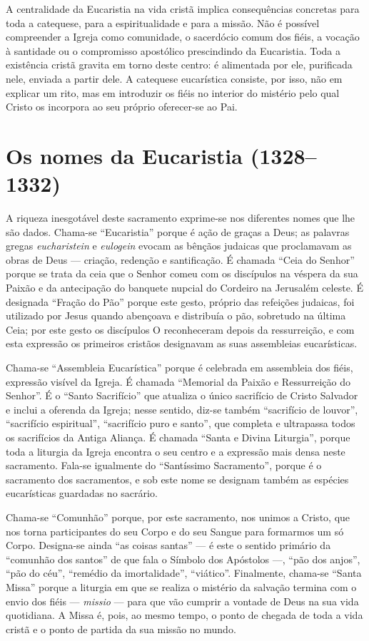 A centralidade da Eucaristia na vida cristã implica consequências concretas para toda a catequese, para a espiritualidade e para a missão. Não é possível compreender a Igreja como comunidade, o sacerdócio comum dos fiéis, a vocação à santidade ou o compromisso apostólico prescindindo da Eucaristia. Toda a existência cristã gravita em torno deste centro: é alimentada por ele, purificada nele, enviada a partir dele. A catequese eucarística consiste, por isso, não em explicar um rito, mas em introduzir os fiéis no interior do mistério pelo qual Cristo os incorpora ao seu próprio oferecer-se ao Pai.

\section{Os nomes da Eucaristia (1328--1332)}

A riqueza inesgotável deste sacramento exprime-se nos diferentes nomes que lhe são dados. Chama-se ``Eucaristia'' porque é ação de graças a Deus; as palavras gregas \emph{eucharistein} e \emph{eulogein} evocam as bênçãos judaicas que proclamavam as obras de Deus --- criação, redenção e santificação. É chamada ``Ceia do Senhor'' porque se trata da ceia que o Senhor comeu com os discípulos na véspera da sua Paixão e da antecipação do banquete nupcial do Cordeiro na Jerusalém celeste. É designada ``Fração do Pão'' porque este gesto, próprio das refeições judaicas, foi utilizado por Jesus quando abençoava e distribuía o pão, sobretudo na última Ceia; por este gesto os discípulos O reconheceram depois da ressurreição, e com esta expressão os primeiros cristãos designavam as suas assembleias eucarísticas.

Chama-se ``Assembleia Eucarística'' porque é celebrada em assembleia dos fiéis, expressão visível da Igreja. É chamada ``Memorial da Paixão e Ressurreição do Senhor''. É o ``Santo Sacrifício'' que atualiza o único sacrifício de Cristo Salvador e inclui a oferenda da Igreja; nesse sentido, diz-se também ``sacrifício de louvor'', ``sacrifício espiritual'', ``sacrifício puro e santo'', que completa e ultrapassa todos os sacrifícios da Antiga Aliança. É chamada ``Santa e Divina Liturgia'', porque toda a liturgia da Igreja encontra o seu centro e a expressão mais densa neste sacramento. Fala-se igualmente do ``Santíssimo Sacramento'', porque é o sacramento dos sacramentos, e sob este nome se designam também as espécies eucarísticas guardadas no sacrário.

Chama-se ``Comunhão'' porque, por este sacramento, nos unimos a Cristo, que nos torna participantes do seu Corpo e do seu Sangue para formarmos um só Corpo. Designa-se ainda ``as coisas santas'' --- é este o sentido primário da ``comunhão dos santos'' de que fala o Símbolo dos Apóstolos ---, ``pão dos anjos'', ``pão do céu'', ``remédio da imortalidade'', ``viático''. Finalmente, chama-se ``Santa Missa'' porque a liturgia em que se realiza o mistério da salvação termina com o envio dos fiéis --- \emph{missio} --- para que vão cumprir a vontade de Deus na sua vida quotidiana. A Missa é, pois, ao mesmo tempo, o ponto de chegada de toda a vida cristã e o ponto de partida da sua missão no mundo.

